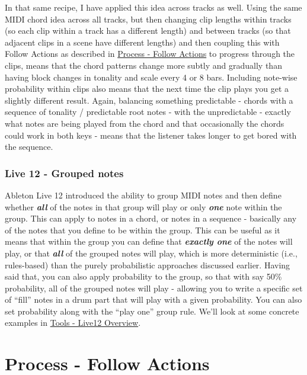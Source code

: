 \documentclass[
  12pt,
  letterpaper,
  oneside,
  open=any]{scrbook}
\begin{document}
In that same recipe, I have applied this idea across tracks as well.
Using the same MIDI chord idea across all tracks, but then changing clip
lengths within tracks (so each clip within a track has a different
length) and between tracks (so that adjacent clips in a scene have
different lengths) and then coupling this with Follow Actions as
described in \hyperref[Chapter-003-Process-Follow_Actions]{Process -
Follow Actions} to progress through the clips, means that the chord
patterns change more subtly and gradually than having block changes in
tonality and scale every 4 or 8 bars. Including note-wise probability
within clips also means that the next time the clip plays you get a
slightly different result. Again, balancing something predictable -
chords with a sequence of tonality / predictable root notes - with the
unpredictable - exactly what notes are being played from the chord and
that occasionally the chords could work in both keys - means that the
listener takes longer to get bored with the sequence.

\subsection{Live 12 - Grouped notes}\label{live-12---grouped-notes}

Ableton Live 12 introduced the ability to group MIDI notes and then
define whether \textbf{\emph{all}} of the notes in that group will play
or only \textbf{\emph{one}} note within the group. This can apply to
notes in a chord, or notes in a sequence - basically any of the notes
that you define to be within the group. This can be useful as it means
that within the group you can define that \textbf{\emph{exactly one}} of
the notes will play, or that \textbf{\emph{all}} of the grouped notes
will play, which is more deterministic (i.e., rules-based) than the
purely probabilistic approaches discussed earlier. Having said that, you
can also apply probability to the group, so that with say 50\%
probability, all of the grouped notes will play - allowing you to write
a specific set of ``fill'' notes in a drum part that will play with a
given probability. You can also set probability along with the ``play
one'' group rule. We'll look at some concrete examples in
\hyperref[Chapter-030-Tools-Live12_Intro]{Tools - Live12 Overview}.


\chapter{Process - Follow
Actions}\label{Chapter-003-Process-Follow_Actions}
\end{document}
